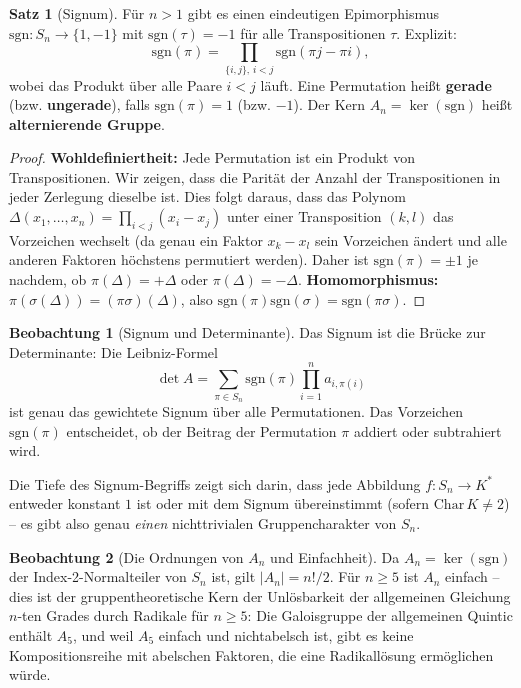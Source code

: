 ﻿\documentclass[a4paper,12pt]{report}
\theoremstyle{definition}
\newtheorem{satz}{Satz}
\newtheorem{beobachtung}{Beobachtung}
\begin{document}
\begin{satz}[Signum]
    Für $n > 1$ gibt es einen eindeutigen Epimorphismus
    $\mathrm{sgn} : S_n \to \{1, -1\}$ mit $\mathrm{sgn}(\tau) = -1$
    für alle Transpositionen $\tau$. Explizit:
    \[
        \mathrm{sgn}(\pi) = \prod_{\{i,j\},\, i < j}
        \mathrm{sgn}(\pi j - \pi i),
    \]
    wobei das Produkt über alle Paare $i < j$ läuft.
    Eine Permutation heißt \textbf{gerade} (bzw. \textbf{ungerade}),
    falls $\mathrm{sgn}(\pi) = 1$ (bzw. $-1$).
    Der Kern $A_n = \ker(\mathrm{sgn})$ heißt \textbf{alternierende Gruppe}.
\end{satz}
\begin{proof}
    \textbf{Wohldefiniertheit:} Jede Permutation ist ein Produkt von Transpositionen.
    Wir zeigen, dass die Parität der Anzahl der Transpositionen in jeder Zerlegung
    dieselbe ist. Dies folgt daraus, dass das Polynom
    $\Delta(x_1,\ldots,x_n) = \prod_{i<j}(x_i - x_j)$ unter einer Transposition
    $(k,l)$ das Vorzeichen wechselt (da genau ein Faktor $x_k - x_l$ sein Vorzeichen
    ändert und alle anderen Faktoren höchstens permutiert werden).
    Daher ist $\mathrm{sgn}(\pi) = \pm 1$ je nachdem, ob $\pi(\Delta) = +\Delta$
    oder $\pi(\Delta) = -\Delta$.
    \textbf{Homomorphismus:} $\pi(\sigma(\Delta)) = (\pi\sigma)(\Delta)$, also
    $\mathrm{sgn}(\pi)\mathrm{sgn}(\sigma) = \mathrm{sgn}(\pi\sigma)$.
\end{proof}

\begin{beobachtung}[Signum und Determinante]
    Das Signum ist die Brücke zur Determinante: Die Leibniz-Formel
    \[
        \det A = \sum_{\pi \in S_n} \mathrm{sgn}(\pi) \prod_{i=1}^n a_{i,\pi(i)}
    \]
    ist genau das gewichtete Signum über alle Permutationen.
    Das Vorzeichen $\mathrm{sgn}(\pi)$ entscheidet, ob der Beitrag
    der Permutation $\pi$ addiert oder subtrahiert wird.

    Die Tiefe des Signum-Begriffs zeigt sich darin, dass jede
    Abbildung $f : S_n \to K^*$ entweder konstant $1$ ist oder
    mit dem Signum übereinstimmt (sofern $\mathrm{Char}\, K \neq 2$) --
    es gibt also genau \emph{einen} nichttrivialen Gruppencharakter von $S_n$.
\end{beobachtung}

\begin{beobachtung}[Die Ordnungen von $A_n$ und Einfachheit]
    Da $A_n = \ker(\mathrm{sgn})$ der Index-2-Normalteiler von $S_n$ ist,
    gilt $|A_n| = n!/2$. Für $n \geq 5$ ist $A_n$ einfach -- dies
    ist der gruppentheoretische Kern der Unlösbarkeit der allgemeinen
    Gleichung $n$-ten Grades durch Radikale für $n \geq 5$: Die
    Galoisgruppe der allgemeinen Quintic enthält $A_5$, und weil
    $A_5$ einfach und nichtabelsch ist, gibt es keine
    Kompositionsreihe mit abelschen Faktoren, die eine Radikallösung
    ermöglichen würde.
\end{beobachtung}
\end{document}
